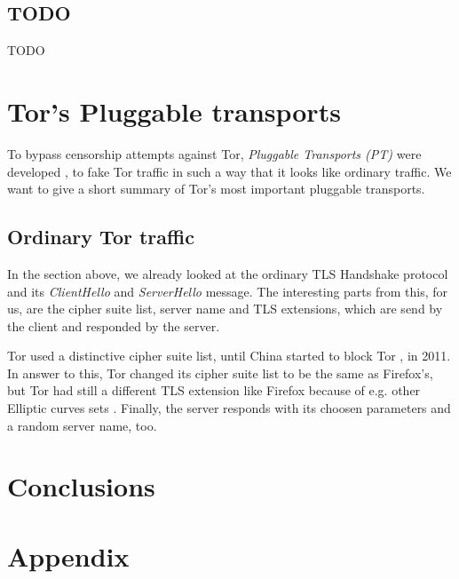 \documentclass[sigconf, screen]{acmart}
\begin{document}
\subsection{TODO}
\label{ss:TODO}
TODO	%
\section{Tor's Pluggable transports}
\label{s:torspluggabletransports}
To bypass censorship attempts against Tor, \textit{Pluggable Transports (PT)} were developed \cite{TorPluggableTransports}, to fake Tor traffic in such a way that it looks like ordinary traffic. We want to give a short summary \cite{TorWikiAChildsGardenOfPluggableTransports} of Tor's most important pluggable transports.
\subsection{Ordinary Tor traffic}
\label{ss:ordinarytortraffic}
In the section above, we already looked at the ordinary TLS Handshake protocol and its \textit{ClientHello} and \textit{ServerHello} message. The interesting parts from this, for us, are the cipher suite list, server name and TLS extensions, which are send by the client and responded by the server.

Tor used a distinctive cipher suite list, until China started to block Tor \cite{foci12-winter} \cite{TorTicket4744}, in 2011. In answer to this, Tor changed its cipher suite list to be the same as Firefox's, but Tor had still a different TLS extension like Firefox because of e.g. other Elliptic curves sets \cite{TorWikiAChildsGardenOfPluggableTransports}. Finally, the server responds with its choosen parameters and a random server name, too.
\section{Conclusions}
\label{s:conclusions}
\appendix
\section{Appendix}
\label{s:appendix}
\end{document}
